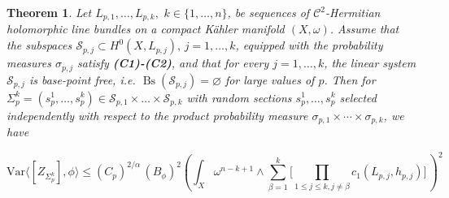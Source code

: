 \documentclass[11pt,leqno,oneside]{amsart}
\newtheorem{thm}{Theorem}[section]
\numberwithin{equation}{section}
\begin{document}
\begin{thm} \label{genvar}
Let $L_{p, 1}, \ldots, L_{p, k}, \,\,k\in \{1, \ldots, n\}$, be sequences of $\mathscr{C}^{2}$-Hermitian holomorphic line bundles on a compact K\"{a}hler manifold $(X, \omega)$. Assume that the subspaces $\mathcal{S}_{p, j} \subset H^{0}(X, L_{p, j}),\,j=1,\ldots, k$, equipped with the probability measures $\sigma_{p, j}$ satisfy \textbf{(C1)-(C2)}, and that for every $j=1,\ldots,k$,
the linear system $\mathcal{S}_{p,j}$ is base-point free, i.e. $\operatorname{Bs}(\mathcal{S}_{p,j})=\varnothing$ for large values of $p$. Then for $\Sigma^{k}_{p}=(s_{p}^{1}, \ldots, s_{p}^{k})\in \mathcal{S}_{p, 1} \times \ldots \times \mathcal{S}_{p, k}$ with random sections $s_{p}^{1}, \ldots, s_{p}^{k}$ selected independently with respect to the product probability measure $\sigma_{p, 1} \times \cdots \times \sigma_{p, k}$, we have

\begin{equation} \label{varra}\mathrm{Var} \langle [Z_{\Sigma_{p}^{k}}], \phi \rangle \leq (C_{p})^{2/\alpha}\,(B_{\phi})^{2}(\int_{X}{\omega^{n-k+1} \wedge \sum_{\beta=1}^{k}{\Big[ \prod_{1\leq j \leq k, j \neq \beta}{c_{1}(L_{p, j}, h_{p, j})}\Big]}\,})^{2}\end{equation}

\end{thm}
\end{document}
